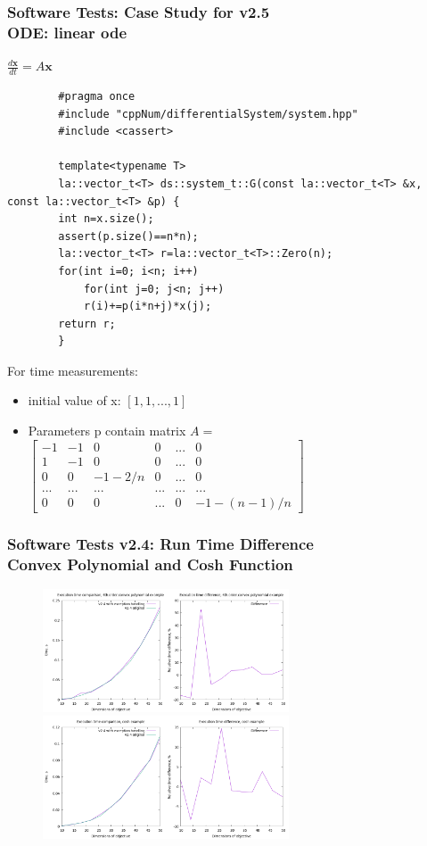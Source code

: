 \documentclass[ucs,10pt]{beamer}
\begin{document}
\begin{frame}[fragile]
\frametitle{Software Tests: Case Study for v2.5 \\
	\small \color{rwth-blue} ODE: linear ode}
	$\frac{d\mathbf{x}}{dt} = A \mathbf{x}$

	\begin{lstlisting}
		#pragma once
		#include "cppNum/differentialSystem/system.hpp"
		#include <cassert>
		
		template<typename T>
		la::vector_t<T> ds::system_t::G(const la::vector_t<T> &x, const la::vector_t<T> &p) {
		int n=x.size();
		assert(p.size()==n*n);
		la::vector_t<T> r=la::vector_t<T>::Zero(n);
		for(int i=0; i<n; i++)
			for(int j=0; j<n; j++)
			r(i)+=p(i*n+j)*x(j);
		return r;
		}
	\end{lstlisting}
	 For time measurements:
        \begin{itemize}
            \item initial value of x: $[1, 1, ..., 1]$
			\item Parameters p contain matrix $A=$
			{\tiny
			$\begin{bmatrix}
				-1 & -1 & 0 & 0 &... & 0\\
				1 & -1 & 0 & 0 &... & 0\\
				0 & 0 & -1-2/n & 0 & ... & 0\\
				... & ... & ... & ... & ... & ...\\
				0 & 0 & 0 & ... & 0 & -1-(n-1)/n 
			\end{bmatrix}$}
        \end{itemize}
\end{frame}
	
\begin{frame}
\frametitle{Software Tests v2.4: Run Time Difference \\
	\small \color{rwth-blue} Convex Polynomial and Cosh Function}
	\begin{figure}
		\centering
		\includegraphics[width=0.65\textwidth]{figures/2.4_4th_order_convex_polynomial.png}
		\vspace{0.3cm}
		\includegraphics[width=0.65\textwidth]{figures/2.4_cosh.png}
	\end{figure}
\end{frame}
	
\end{document}
